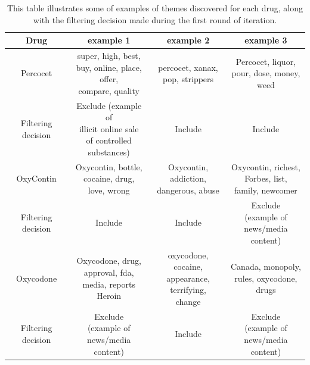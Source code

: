 \begin{table}
\centering
\small
\begin{tabular}{|c|c|c|c|}
\hline
Drug & example 1 & example 2 & example 3 \\
\hline
Percocet & \pbox{20cm}{super, high, best, \\ buy, online, place, offer,\\ compare, quality} & \pbox{20cm}{percocet, xanax, \\ pop, strippers} & \pbox{20cm}{Percocet, liquor, \\ pour, dose, money, \\ weed}\\
\hline
Filtering decision & \pbox{20cm}{Exclude (example of \\ illicit online sale \\ of controlled substances)}&   Include &Include\\
\hline
\hline
OxyContin & \pbox{20cm}{Oxycontin, bottle, \\ cocaine, drug, \\love, wrong} & \pbox{20cm}{Oxycontin, addiction, \\dangerous, abuse} & \pbox{20cm}{Oxycontin, richest,\\ Forbes, list, \\family, newcomer}\\
\hline
Filtering decision & Include & Include & \pbox{20cm}{Exclude \\(example of\\ news/media content)}\\
\hline
\hline
Oxycodone & \pbox{20cm}{Oxycodone, drug, \\approval, fda, \\media, reports  Heroin} & \pbox{20cm}{oxycodone, cocaine, \\appearance, terrifying, \\change}  & \pbox{20cm}{Canada, monopoly, \\rules, oxycodone, drugs}\\
\hline
Filtering decision &\pbox{20cm} {Exclude \\(example of \\ news/media content)}& Include & \pbox{20cm}{Exclude \\(example of \\news/media content)} \\
\hline
\hline
\end{tabular}
\caption[Example themes discovered for each drug]{This table illustrates some of examples of themes 
discovered for each drug, along with the filtering decision made during the first round of iteration.}
\label{table:themes_filtering_decision}
\end{table}
